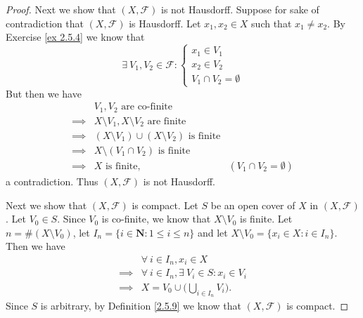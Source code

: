 \begin{proof}
    Next we show that \((X, \mathcal{F})\) is not Hausdorff.
    Suppose for sake of contradiction that \((X, \mathcal{F})\) is Hausdorff.
    Let \(x_1, x_2 \in X\) such that \(x_1 \neq x_2\).
    By Exercise \ref{ex 2.5.4} we know that
    \[
        \exists\ V_1, V_2 \in \mathcal{F} : \begin{cases}
            x_1 \in V_1 \\
            x_2 \in V_2 \\
            V_1 \cap V_2 = \emptyset
        \end{cases}
    \]
    But then we have
    \begin{align*}
                 & V_1, V_2 \text{ are co-finite}                                                          \\
        \implies & X \setminus V_1, X \setminus V_2 \text{ are finite}                                     \\
        \implies & (X \setminus V_1) \cup (X \setminus V_2) \text{ is finite}                              \\
        \implies & X \setminus (V_1 \cap V_2) \text{ is finite}                                            \\
        \implies & X \text{ is finite},                                       & (V_1 \cap V_2 = \emptyset)
    \end{align*}
    a contradiction.
    Thus \((X, \mathcal{F})\) is not Hausdorff.

    Next we show that \((X, \mathcal{F})\) is compact.
    Let \(S\) be an open cover of \(X\) in \((X, \mathcal{F})\).
    Let \(V_0 \in S\).
    Since \(V_0\) is co-finite, we know that \(X \setminus V_0\) is finite.
    Let \(n = \#(X \setminus V_0)\), let \(I_n = \{i \in \mathbf{N} : 1 \leq i \leq n\}\) and let \(X \setminus V_0 = \{x_i \in X : i \in I_n\}\).
    Then we have
    \begin{align*}
                 & \forall\ i \in I_n, x_i \in X                        \\
        \implies & \forall\ i \in I_n, \exists\ V_i \in S : x_i \in V_i \\
        \implies & X = V_0 \cup \bigg(\bigcup_{i \in I_n} V_i\bigg).
    \end{align*}
    Since \(S\) is arbitrary, by Definition \ref{2.5.9} we know that \((X, \mathcal{F})\) is compact.


\end{proof}
